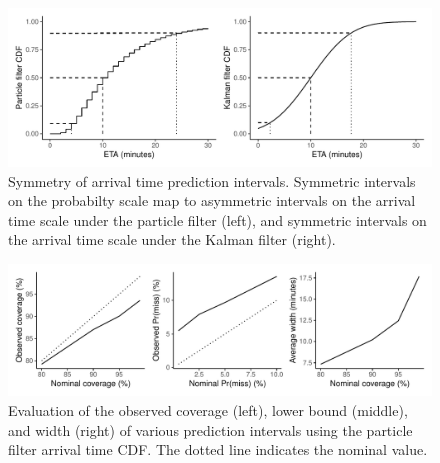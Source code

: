 \begin{knitrout}\small
{}\color{fgcolor}\begin{figure}

{\centering \includegraphics[width=\textwidth]{figure/eta_dist_skew-1} 

}

\caption[Symmetry of arrival time prediction intervals]{Symmetry of arrival time prediction intervals. Symmetric intervals on the probabilty scale map to asymmetric intervals on the arrival time scale under the particle filter (left), and symmetric intervals on the arrival time scale under the Kalman filter (right).}\label{fig:eta_dist_skew}
\end{figure}


\end{knitrout}


\begin{knitrout}\small
{}\color{fgcolor}\begin{figure}

{\centering \includegraphics[width=\textwidth]{figure/eta_cis-1} 

}

\caption[Evaluation of prediction intervals from the particle filter arrival time CDF]{Evaluation of the observed coverage (left), lower bound (middle), and width (right) of various prediction intervals using the particle filter arrival time CDF. The dotted line indicates the nominal value.}\label{fig:eta_cis}
\end{figure}


\end{knitrout}



